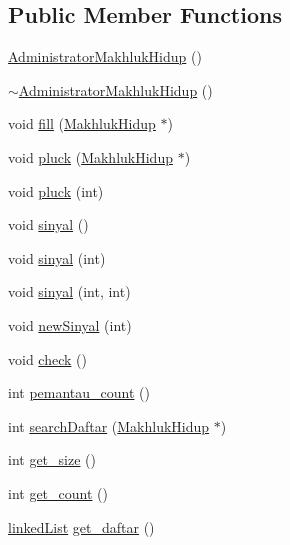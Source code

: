 \subsection*{Public Member Functions}
\begin{DoxyCompactItemize}
\item 
\hyperlink{class_administrator_makhluk_hidup_af6865831eedbc2027dc3350dcd424350}{Administrator\+Makhluk\+Hidup} ()
\item 
\hyperlink{class_administrator_makhluk_hidup_abfde8ad0fc54a956bb789ddeb5086056}{$\sim$\+Administrator\+Makhluk\+Hidup} ()
\item 
void \hyperlink{class_administrator_makhluk_hidup_a73f1c4f851ace0e6e5d4dda99ca1a963}{fill} (\hyperlink{class_makhluk_hidup}{Makhluk\+Hidup} $\ast$)
\item 
void \hyperlink{class_administrator_makhluk_hidup_a0766cdee6be5104128c72a6ddbc6de19}{pluck} (\hyperlink{class_makhluk_hidup}{Makhluk\+Hidup} $\ast$)
\item 
void \hyperlink{class_administrator_makhluk_hidup_a5faae20a3dfedeab6432ab0a251a7533}{pluck} (int)
\item 
void \hyperlink{class_administrator_makhluk_hidup_a9c62c4de8062108c6e7f08fc685c1e12}{sinyal} ()
\item 
void \hyperlink{class_administrator_makhluk_hidup_a19b242132b86ca2f3dfa2b9b1e319c33}{sinyal} (int)
\item 
void \hyperlink{class_administrator_makhluk_hidup_a0d0d848b66036b6fb9049f0c8602679c}{sinyal} (int, int)
\item 
void \hyperlink{class_administrator_makhluk_hidup_ae09bcabbe3e6b41d74fcf38df75ecd29}{new\+Sinyal} (int)
\item 
void \hyperlink{class_administrator_makhluk_hidup_adbb9837f2c59f5147548659998a4f96f}{check} ()
\item 
int \hyperlink{class_administrator_makhluk_hidup_a3b963943dc24f9c59644c129d1533119}{pemantau\+\_\+count} ()
\item 
int \hyperlink{class_administrator_makhluk_hidup_a693b1be073679e82bb16c39e2b9f849e}{search\+Daftar} (\hyperlink{class_makhluk_hidup}{Makhluk\+Hidup} $\ast$)
\item 
int \hyperlink{class_administrator_makhluk_hidup_aa3da88881045da27c9fcb469215bce70}{get\+\_\+size} ()
\item 
int \hyperlink{class_administrator_makhluk_hidup_a69edc3e32e43b014497a543a1e8bc1b9}{get\+\_\+count} ()
\item 
\hyperlink{classlinked_list}{linked\+List} \hyperlink{class_administrator_makhluk_hidup_ac56aab464b2302140e53c3e33dd2b3ae}{get\+\_\+daftar} ()

\end{DoxyCompactItemize}
